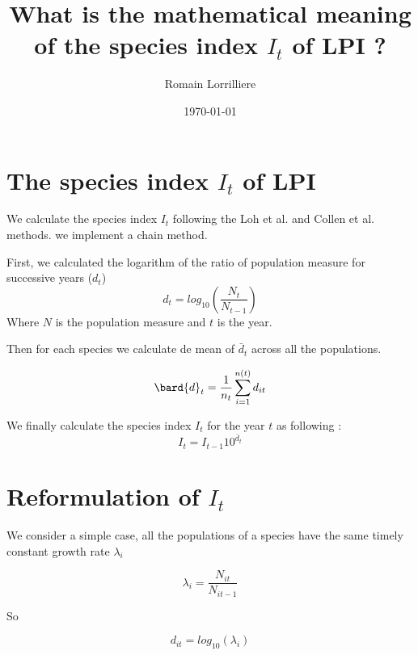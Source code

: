\documentclass[A4,7pt]{article}
\begin{document}
\title{What is the mathematical meaning of the species index $I_t$ of
  LPI ?} 
\date{\today}
\author{Romain Lorrilliere}

 \maketitle

 \section{The species index $I_t$  of LPI}
We calculate the species index $I_t$ following the Loh et al. 
and Collen et al. \cite{loh_living_2005,collen_monitoring_2009} methods. we implement a chain method.

First, we calculated the logarithm of the ratio of population 
 measure for successive years ($d_t$)
 \begin{equation}
   \label{eq:dt}
   d_t = log_{10}\left(\frac{N_t}{N_{t-1}}\right)
 \end{equation}
 Where $N$ is the population measure and $t$ is the year.

 Then for each species we calculate de mean of $\bar{d}_t$ across all
 the populations.

 
 \begin{equation}
   \label{eq:d_bar}
   \bard{d}_t=\frac{1}{n_t}\sum_{i=1}^{n(t)}d_{it}
 \end{equation}

We finally calculate the species index $I_t$ for the year $t$ as
following :
\begin{equation}
  \label{eq:I}
  I_t = I_{t-1}10^{\bar{d}_t}
\end{equation}


\section{Reformulation of $I_t$ }

We consider a simple case, all the populations of a species have the
same timely constant growth rate $\lambda_i$ 

\begin{equation}
  \label{eq:lambda}
  \lambda_i = \frac{N_{it}}{N_{it-1}}
\end{equation}

So

\begin{equation}
  \label{eq:dt2}
   d_{it} = log_{10}\left(\lambda_i\right)
\end{equation}
\end{document}

